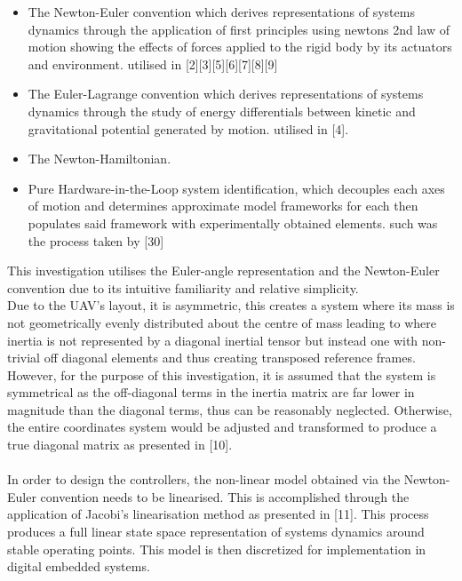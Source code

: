 \documentclass[12pt,a4paper,twoside]{report}
\begin{document}
				\begin{itemize}
					\item
						The Newton-Euler convention which derives representations of systems dynamics through the application of first principles using newtons 2nd law of motion showing the effects of forces applied to the rigid body by its actuators and environment. utilised in [2][3][5][6][7][8][9]
					\item 
						The Euler-Lagrange convention which derives representations of systems dynamics through the study of energy differentials between kinetic and gravitational potential generated by motion. utilised in [4]. 
					\item 
						The Newton-Hamiltonian.
					\item 
						Pure Hardware-in-the-Loop system identification, which decouples each axes of motion and determines approximate model frameworks for each then populates said framework with experimentally obtained elements. such was the process taken by [30]
				\end{itemize}
				\space
				This investigation utilises the Euler-angle representation and the Newton-Euler convention due to its intuitive familiarity and relative simplicity.
				\\
				Due to the UAV's layout, it is asymmetric, this creates a system where its mass is not geometrically evenly distributed about the centre of mass leading to where inertia is not represented by a diagonal inertial tensor but instead one with non-trivial off diagonal elements and thus creating transposed reference frames. However, for the purpose of this investigation, it is assumed that the system is symmetrical as the off-diagonal terms in the inertia matrix are far lower in magnitude than the diagonal terms, thus can be reasonably neglected. Otherwise, the entire coordinates system would be adjusted and transformed to produce a true diagonal matrix as presented in [10]. 
				\\ \\
				In order to design the controllers, the non-linear model obtained via the Newton-Euler convention needs to be linearised. This is accomplished through the application of Jacobi’s linearisation method as presented in [11]. This process produces a full linear state space representation of systems dynamics around stable operating points. This model is then discretized for implementation in digital embedded systems.
				
\end{document}
